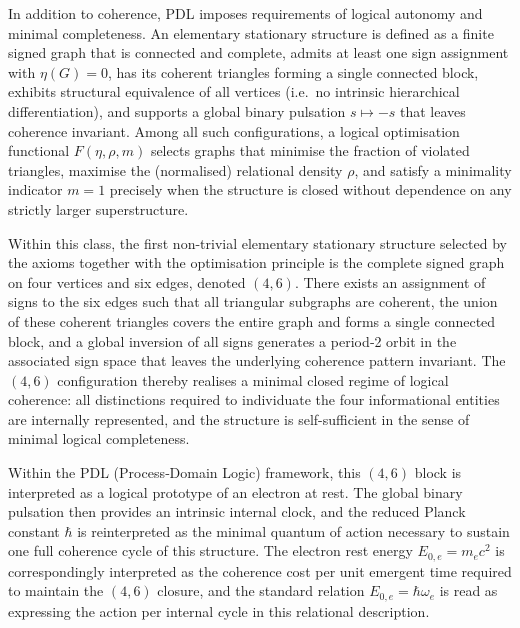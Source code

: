 \documentclass[11pt,a4paper]{article}
\begin{document}
In addition to coherence, PDL imposes requirements of logical autonomy and minimal completeness. An elementary stationary structure is defined as a finite signed graph that is connected and complete, admits at least one sign assignment with $\eta(G)=0$, has its coherent triangles forming a single connected block, exhibits structural equivalence of all vertices (i.e.\ no intrinsic hierarchical differentiation), and supports a global binary pulsation $s\mapsto -s$ that leaves coherence invariant.\cite{LaubscherPDLFull2026,LaubscherLDP2026,LaubscherIMRadPDL2026} Among all such configurations, a logical optimisation functional $F(\eta,\rho,m)$ selects graphs that minimise the fraction of violated triangles, maximise the (normalised) relational density $\rho$, and satisfy a minimality indicator $m=1$ precisely when the structure is closed without dependence on any strictly larger superstructure.\cite{LaubscherIntroPDL2026,LaubscherPDLFull2026}

Within this class, the first non-trivial elementary stationary structure selected by the axioms together with the optimisation principle is the complete signed graph on four vertices and six edges, denoted $(4,6)$.\cite{LaubscherIntroPDL2026,LaubscherPDLFull2026} There exists an assignment of signs to the six edges such that all triangular subgraphs are coherent, the union of these coherent triangles covers the entire graph and forms a single connected block, and a global inversion of all signs generates a period‑2 orbit in the associated sign space that leaves the underlying coherence pattern invariant.\cite{LaubscherPDLFull2026,LaubscherLDP2026} The $(4,6)$ configuration thereby realises a minimal closed regime of logical coherence: all distinctions required to individuate the four informational entities are internally represented, and the structure is self-sufficient in the sense of minimal logical completeness.

Within the PDL (Process‑Domain Logic) framework, this $(4,6)$ block is interpreted as a logical prototype of an electron at rest.\cite{LaubscherIntroPDL2026,LaubscherPDLFull2026} The global binary pulsation then provides an intrinsic internal clock, and the reduced Planck constant $\hbar$ is reinterpreted as the minimal quantum of action necessary to sustain one full coherence cycle of this structure. The electron rest energy $E_{0,e}=m_ec^2$ is correspondingly interpreted as the coherence cost per unit emergent time required to maintain the $(4,6)$ closure, and the standard relation $E_{0,e}=\hbar\omega_e$ is read as expressing the action per internal cycle in this relational description.\cite{LaubscherLDP2026,LaubscherIMRadPDL2026}
\end{document}
